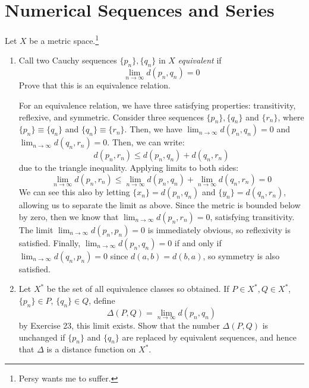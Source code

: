 \documentclass[10pt]{article}
\begin{document}
	\section{Numerical Sequences and Series}
	\begin{problem}
		Let \( X \) be a metric space.\footnote{Persy wants me to suffer.}
		\begin{enumerate}[label=\alph*)]
			\item Call two Cauchy sequences \( \{p_n\} ,  \{q_n\} \) in \( X \) \textit{equivalent} if 
				\[
				\lim_{n \to \infty}d(p_n, q_n) = 0
				\] 
				Prove that this is an equivalence relation. 

				\begin{solution}
					For an equivalence relation, we have three satisfying properties: transitivity, reflexive, and 
					symmetric. 
					Consider three sequences \( \{p_n\}, \{q_n\}  \) and \( \{r_n\}  \), where 
					\( \{p_n\} \equiv \{q_n\}  \) and \( \{q_n\}  \equiv \{r_n\}  \). Then, we have 
					\( \lim_{n \to \infty}d(p_n, q_n) = 0 \) and \( \lim_{n \to \infty}d(q_n, r_n) = 0 \). Then, 
					we can write:
					\[
					d(p_n, r_n) \le d(p_n, q_n) + d(q_n, r_n)
					\] 
					due to the triangle inequality. Applying limits to both sides:
					\[
					\lim_{n \to \infty}d(p_n, r_n) \le \lim_{n\to \infty}d(p_n, q_n) + \lim_{n \to \infty}d(q_n, r_n)
					= 0
					\] 
					We can see this also by letting \( \{x_n\} = d(p_n, q_n) \) and \( \{y_n\} = d(q_n, r_n) \), 
					allowing us to separate the limit as above. 
					Since the metric is bounded below by zero, then we know that \( \lim_{n \to \infty}d(p_n, r_n) 
					= 0\), satisfying transitivity. The limit \( \lim_{n \to \infty}d(p_n, p_n) = 0 \) is 
					immediately obvious, so reflexivity is satisfied. Finally, 
					\( \lim_{n \to \infty}d(p_n, q_n) = 0 \) if and only if	\( \lim_{n \to \infty}d(q_n, p_n) = 0 \) 
					since \( d(a, b) = d(b, a) \), so symmetry is also satisfied. 
				\end{solution}
			\item Let \( X^{*} \) be the set of all equivalence classes so obtained. If \( P \in X^{*}, 
				Q \in X^{*}\), \( \{p_n\}  \in P \), \( \{q_n\}  \in Q \), define 
				\[
				\Delta(P, Q) = \lim_{n \to \infty}d(p_n, q_n)
				\] 
				by Exercise 23, this limit exists. Show that the number \( \Delta(P, Q) \) is unchanged if 
				\( \{p_n\}  \) and \( \{q_n\}  \) are replaced by equivalent sequences, and hence that 
				\( \Delta \) is a distance function on \( X^{*} \). 


\end{enumerate}
\end{problem}
\end{document}
